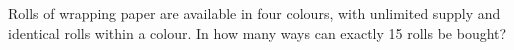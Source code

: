 Rolls of wrapping paper are available in four colours, with unlimited supply and identical rolls within a colour. In how many ways can exactly 15 rolls be bought?
